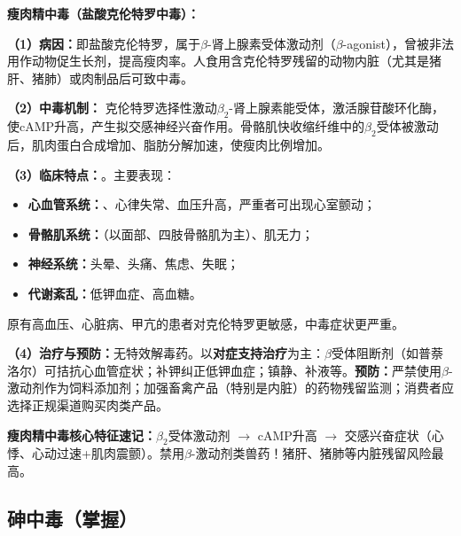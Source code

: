 \begin{keybox}
\textbf{瘦肉精中毒（盐酸克伦特罗中毒）：}

\textbf{（1）病因：}即盐酸克伦特罗，属于$\beta$-肾上腺素受体激动剂（$\beta$-agonist），曾被非法用作动物促生长剂，提高瘦肉率。人食用含克伦特罗残留的动物内脏（尤其是猪肝、猪肺）或肉制品后可致中毒。

\textbf{（2）中毒机制：}\difficulty
克伦特罗选择性激动$\beta_2$-肾上腺素能受体，激活腺苷酸环化酶，使cAMP升高，产生拟交感神经兴奋作用。骨骼肌快收缩纤维中的$\beta_2$受体被激动后，肌肉蛋白合成增加、脂肪分解加速，使瘦肉比例增加。

\textbf{（3）临床特点：}。主要表现：
\begin{itemize}[leftmargin=*]
    \item \textbf{心血管系统：}、心律失常、血压升高，严重者可出现心室颤动；
    \item \textbf{骨骼肌系统：}（以面部、四肢骨骼肌为主）、肌无力；
    \item \textbf{神经系统：}头晕、头痛、焦虑、失眠；
    \item \textbf{代谢紊乱：}低钾血症、高血糖。
\end{itemize}
原有高血压、心脏病、甲亢的患者对克伦特罗更敏感，中毒症状更严重。

\textbf{（4）治疗与预防：}无特效解毒药。以\textbf{对症支持治疗}为主：$\beta$受体阻断剂（如普萘洛尔）可拮抗心血管症状；补钾纠正低钾血症；镇静、补液等。\textbf{预防：}严禁使用$\beta$-激动剂作为饲料添加剂；加强畜禽产品（特别是内脏）的药物残留监测；消费者应选择正规渠道购买肉类产品。
\end{keybox}

\begin{exambox}
\textbf{瘦肉精中毒核心特征速记：}$\beta_2$受体激动剂 $\to$ cAMP升高 $\to$ 交感兴奋症状（心悸、心动过速+肌肉震颤）。禁用$\beta$-激动剂类兽药！猪肝、猪肺等内脏残留风险最高。
\end{exambox}

\subsection{砷中毒（掌握）}

